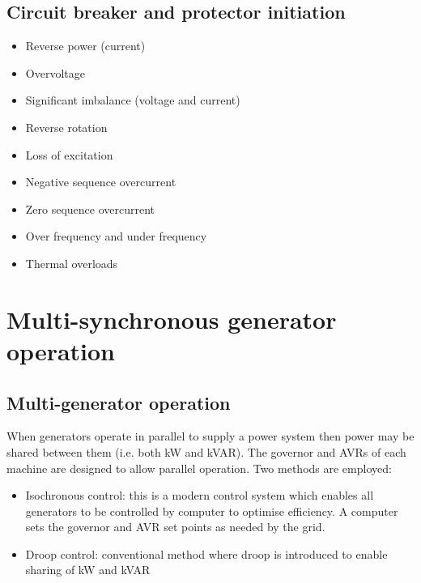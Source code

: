 \subsection{Circuit breaker and protector initiation}
\begin{itemize}
    \item Reverse power (current)
    \item Overvoltage
    \item Significant imbalance (voltage and current)
    \item Reverse rotation
    \item Loss of excitation
    \item Negative sequence overcurrent
    \item Zero sequence overcurrent
    \item Over frequency and under frequency
    \item Thermal overloads
\end{itemize}
\section{Multi-synchronous generator operation}
\subsection{Multi-generator operation}
When generators operate in parallel to supply a power system then power may be shared between them (i.e. both \si{\kilo\watt} and \si{kVAR}). The governor and AVRs of each machine are designed to allow parallel operation. Two methods are employed:
\begin{itemize}
    \item Isochronous control: this is a modern control system which enables all generators to be controlled by computer to optimise efficiency. A computer sets the governor and AVR set points as needed by the grid.
    \item Droop control: conventional method where droop is introduced to enable sharing of \si{\kilo\watt} and \si{kVAR}
\end{itemize}
